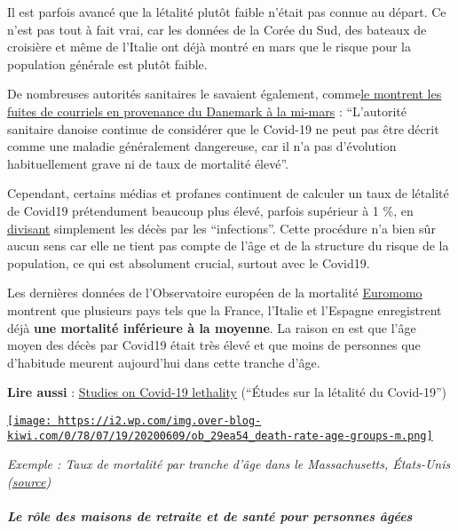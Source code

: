 Il est parfois avancé que la létalité plutôt faible n'était pas connue
au départ. Ce n'est pas tout à fait vrai, car les données de la Corée du
Sud, des bateaux de croisière et même de l'Italie ont déjà montré en
mars que le risque pour la population générale est plutôt faible.

De nombreuses autorités sanitaires le savaient également,
comme\href{https://www.thelocal.dk/20200529/leaked-emails-show-how-denmarks-pm-steam-rollered-her-own-health-agency}{le
montrent les fuites de courriels en provenance du Danemark à la mi-mars}
: ``L'autorité sanitaire danoise continue de considérer que le Covid-19
ne peut pas être décrit comme une maladie généralement dangereuse, car
il n'a pas d'évolution habituellement grave ni de taux de mortalité
élevé''.

Cependant, certains médias et profanes continuent de calculer un taux de
létalité de Covid19 prétendument beaucoup plus élevé, parfois supérieur
à 1 \%, en
\href{https://english.elpais.com/society/2020-05-14/antibody-study-shows-just-5-of-spaniards-have-contracted-the-coronavirus.html}{divisant}
simplement les décès par les ``infections''. Cette procédure n'a bien
sûr aucun sens car elle ne tient pas compte de l'âge et de la structure
du risque de la population, ce qui est absolument crucial, surtout avec
le Covid19.

Les dernières données de l'Observatoire européen de la mortalité
\href{https://www.euromomo.eu/graphs-and-maps/}{Euromomo} montrent que
plusieurs pays tels que la France, l'Italie et l'Espagne enregistrent
déjà \textbf{une mortalité inférieure à la moyenne}. La raison en est
que l'âge moyen des décès par Covid19 était très élevé et que moins de
personnes que d'habitude meurent aujourd'hui dans cette tranche d'âge.

\textbf{Lire aussi} :
\href{https://swprs.org/studies-on-covid-19-lethality/}{Studies on
Covid-19 lethality} (``Études sur la létalité du Covid-19'')

\href{http://img.over-blog-kiwi.com/0/78/07/19/20200609/ob_29ea54_death-rate-age-groups-m.png\#width=600\&height=339}{\texttt{[image: https://i2.wp.com/img.over-blog-kiwi.com/0/78/07/19/20200609/ob\_29ea54\_death-rate-age-groups-m.png]}}

\emph{Exemple : Taux de mortalité par tranche d'âge dans le
Massachusetts, États-Unis
(\href{https://www.mass.gov/doc/covid-19-dashboard-may-6-2020/download}{source})}

\hypertarget{le-ruxf4le-des-maisons-de-retraite-et-de-santuxe9-pour-personnes-uxe2guxe9es}{%
\subparagraph{\texorpdfstring{\textbf{Le rôle des maisons de retraite et
de santé pour personnes
âgées}}{Le rôle des maisons de retraite et de santé pour personnes âgées}}\label{le-ruxf4le-des-maisons-de-retraite-et-de-santuxe9-pour-personnes-uxe2guxe9es}}

